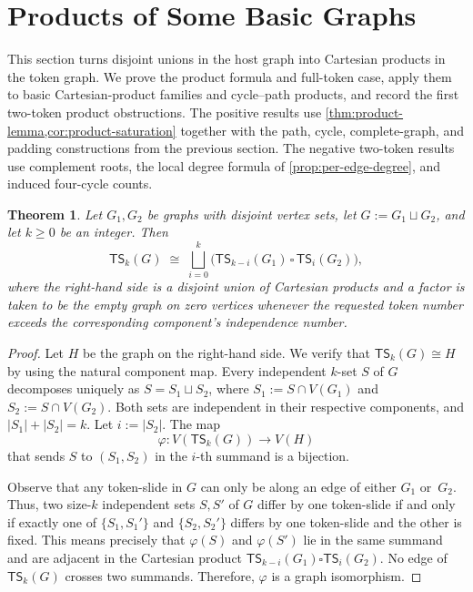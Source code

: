 \documentclass[a4paper]{article}
\theoremstyle{plain}
\newtheorem{theorem}{Theorem}[section]
\theoremstyle{definition}
\newcommand{\TSsym}{\mathsf{TS}}
\numberwithin{equation}{section}
\begin{document}
\section{Products of Some Basic Graphs}
\label{sec:product-construction}

This section turns disjoint unions in the host graph into Cartesian products in the token graph.
We prove the product formula and full-token case, apply them to basic Cartesian-product families and cycle--path products, and record the first two-token product obstructions.
The positive results use \cref{thm:product-lemma,cor:product-saturation} together with the path, cycle, complete-graph, and padding constructions from the previous section.
The negative two-token results use complement roots, the local degree formula of \cref{prop:per-edge-degree}, and induced four-cycle counts.

\begin{theorem}
\label{thm:product-lemma}
Let $G_1,G_2$ be graphs with disjoint vertex sets, let $G:=G_1\sqcup G_2$, and let $k\ge 0$ be an integer.
Then
\[
\TSsym_k(G)\;\cong\;\bigsqcup_{i=0}^{k}\big(\TSsym_{k-i}(G_1)\,\square\,\TSsym_i(G_2)\big),
\]
where the right-hand side is a disjoint union of Cartesian products and a factor is taken to be the empty graph on zero vertices whenever the requested token number exceeds the corresponding component's independence number.
\end{theorem}

\begin{proof}
Let $H$ be the graph on the right-hand side.
We verify that $\TSsym_k(G)\cong H$ by using the natural component map.
Every independent $k$-set $S$ of $G$ decomposes uniquely as $S=S_1\sqcup S_2$, where $S_1:=S\cap V(G_1)$ and $S_2:=S\cap V(G_2)$.
Both sets are independent in their respective components, and $|S_1|+|S_2|=k$.
Let $i:=|S_2|$.
The map
\[
\varphi\colon V(\TSsym_k(G))\to V(H)
\]
that sends $S$ to $(S_1,S_2)$ in the $i$-th summand is a bijection.

Observe that any token-slide in $G$ can only be along an edge of either $G_1$ or~$G_2$.
Thus, two size-$k$ independent sets $S,S'$ of $G$ differ by one token-slide if and only if exactly one of $\{S_1,S_1'\}$ and $\{S_2,S_2'\}$ differs by one token-slide and the other is fixed.
This means precisely that $\varphi(S)$ and $\varphi(S')$ lie in the same summand and are adjacent in the Cartesian product $\TSsym_{k-i}(G_1)\square \TSsym_i(G_2)$.
No edge of $\TSsym_k(G)$ crosses two summands.
Therefore, $\varphi$ is a graph isomorphism.
\end{proof}
\end{document}
